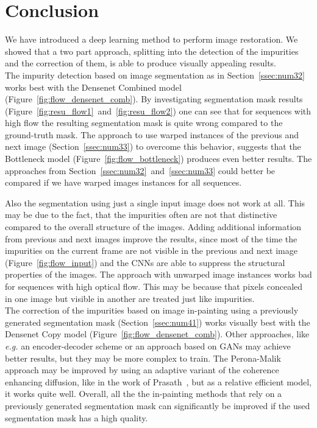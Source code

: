 \newpage
\section{Conclusion}
\label{sec:num6}

We have introduced a deep learning method to perform image restoration. We showed that a two part approach, splitting into the detection of the impurities and the correction of them, is able to produce visually appealing results.\\

The impurity detection based on image segmentation as in Section~\ref{ssec:num32} works best with the Densenet Combined model (Figure~\ref{fig:flow_densenet_comb}). By investigating segmentation mask results (Figure~\ref{fig:resu_flow1}~and~\ref{fig:resu_flow2}) one can see that for sequences with high flow the resulting segmentation mask is quite wrong compared to the ground-truth mask. The approach to use warped instances of the previous and next image (Section~\ref{ssec:num33}) to overcome this behavior, suggests that the Bottleneck model (Figure~\ref{fig:flow_bottleneck}) produces even better results. The approaches from Section~\ref{ssec:num32}~and~\ref{ssec:num33} could better be compared if we have warped images instances for all sequences.

Also the segmentation using just a single input image does not work at all. This may be due to the fact, that the impurities often are not that distinctive compared to the overall structure of the images. Adding additional information from previous and next images improve the results, since most of the time the impurities on the current frame are not visible in the previous and next image (Figure~\ref{fig:flow_input}) and the CNNs are able to suppress the structural properties of the images. The approach with unwarped image instances works bad for sequences with high optical flow. This may be because that pixels concealed in one image but visible in another are treated just like impurities. \\

The correction of the impurities based on image in-painting using a previously generated segmentation mask (Section~\ref{ssec:num41}) works visually best with the Densenet Copy model (Figure~\ref{fig:flow_densenet_comb}). Other approaches, like \textit{e.g.} an encoder-decoder scheme or an approach based on GANs may achieve better results, but they may be more complex to train. The Perona-Malik approach may be improved by using an adaptive variant of the coherence enhancing diffusion, like in the work of Prasath~\cite{Prasath16}, but as a relative efficient model, it works quite well. Overall, all the the in-painting methods that rely on a previously generated segmentation mask can significantly be improved if the used segmentation mask has a high quality. 

